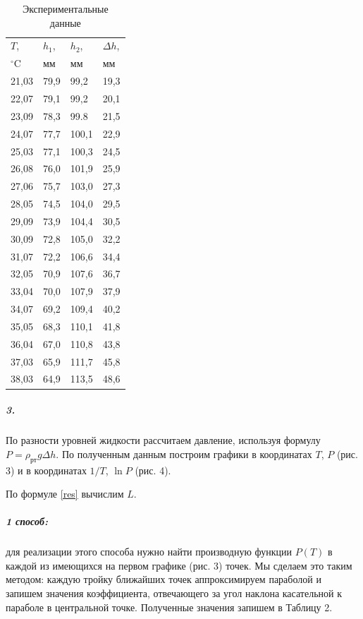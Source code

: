 \documentclass[a4paper,12pt]{article}
\begin{document}
\begin{table}[h!] 
	\caption{Экспериментальные данные}
	\begin{center}
	\begin{tabular}{|*{4}{l|}}
		\hline 
		$T$,&$h_1$,&$h_2$,&$\Delta h$,\\ 
		$^{\circ}$C&мм&мм&мм\\ \hline

		21,03 &79,9 &99,2 &19,3  \\ \hline 
		22,07&79,1&99,2&20,1  \\ \hline 
		23,09&78,3&99.8&21,5 \\ \hline 
		24,07&77,7&100,1&22,9 \\ \hline 
		25,03&77,1&100,3&24,5\\ \hline 
		26,08& 76,0&101,9&25,9 \\ \hline 
		27,06 &75,7 &103,0&27,3  \\ \hline 
		28,05 &74,5&104,0&29,5     \\ \hline 
		29,09 &73,9&104,4 &30,5      \\ \hline 
		30,09 &72,8&105,0&32,2      \\ \hline 
		31,07 &72,2&106,6&34,4      \\ \hline 
		32,05 &70,9&107,6&36,7     \\ \hline 
		33,04&70,0 &107,9&37,9      \\ \hline 
		34,07&69,2&109,4&40,2      \\ \hline 
		35,05 &68,3&110,1&41,8     \\ \hline 
		36,04 &67,0&110,8&43,8      \\ \hline 
		37,03 &65,9&111,7&45,8      \\ \hline 
		38,03 &64,9&113,5    &48,6     \\ \hline 

	\end{tabular}

\end{center}
\end{table}



\subparagraph*{3.}  По разности уровней жидкости рассчитаем давление, используя формулу $P = \rho_{рт} g \Delta h$. По полученным данным построим графики в координатах $T$,  $P$ (рис. 3)  и в координатах $1/T$,  $\ln P$ (рис. 4). 

По формуле \eqref{res} вычислим $L$.


\subparagraph*{1 способ:} для реализации этого способа нужно найти производную функции $P(T)$ в каждой из имеющихся на первом графике (рис. 3) точек. Мы сделаем это таким методом: каждую тройку ближайших точек аппроксимируем параболой и запишем значения коэффициента, отвечающего за угол наклона касательной к параболе в центральной точке. Полученные значения запишем в Таблицу 2.
\end{document}

